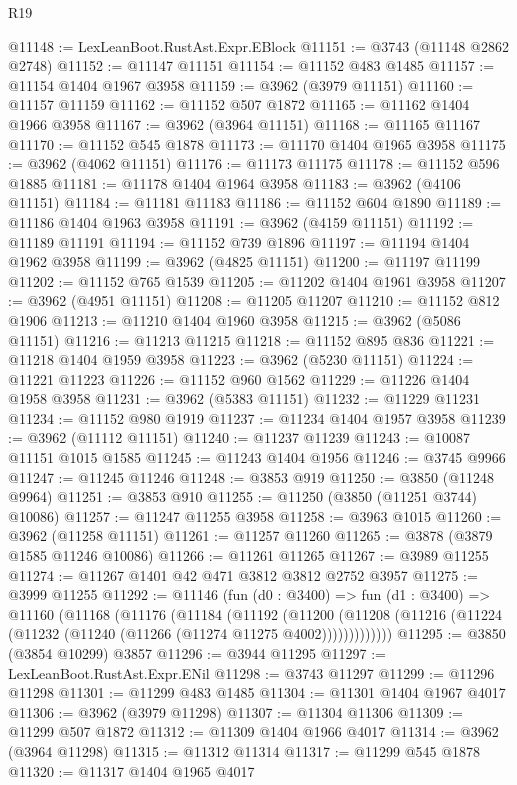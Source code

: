 \begin{lexlean}{R19}
\begin{coremodule}
@11148 := LexLeanBoot.RustAst.Expr.EBlock
@11151 := @3743 (@11148 @2862 @2748)
@11152 := @11147 @11151
@11154 := @11152 @483 @1485
@11157 := @11154 @1404 @1967 @3958
@11159 := @3962 (@3979 @11151)
@11160 := @11157 @11159
@11162 := @11152 @507 @1872
@11165 := @11162 @1404 @1966 @3958
@11167 := @3962 (@3964 @11151)
@11168 := @11165 @11167
@11170 := @11152 @545 @1878
@11173 := @11170 @1404 @1965 @3958
@11175 := @3962 (@4062 @11151)
@11176 := @11173 @11175
@11178 := @11152 @596 @1885
@11181 := @11178 @1404 @1964 @3958
@11183 := @3962 (@4106 @11151)
@11184 := @11181 @11183
@11186 := @11152 @604 @1890
@11189 := @11186 @1404 @1963 @3958
@11191 := @3962 (@4159 @11151)
@11192 := @11189 @11191
@11194 := @11152 @739 @1896
@11197 := @11194 @1404 @1962 @3958
@11199 := @3962 (@4825 @11151)
@11200 := @11197 @11199
@11202 := @11152 @765 @1539
@11205 := @11202 @1404 @1961 @3958
@11207 := @3962 (@4951 @11151)
@11208 := @11205 @11207
@11210 := @11152 @812 @1906
@11213 := @11210 @1404 @1960 @3958
@11215 := @3962 (@5086 @11151)
@11216 := @11213 @11215
@11218 := @11152 @895 @836
@11221 := @11218 @1404 @1959 @3958
@11223 := @3962 (@5230 @11151)
@11224 := @11221 @11223
@11226 := @11152 @960 @1562
@11229 := @11226 @1404 @1958 @3958
@11231 := @3962 (@5383 @11151)
@11232 := @11229 @11231
@11234 := @11152 @980 @1919
@11237 := @11234 @1404 @1957 @3958
@11239 := @3962 (@11112 @11151)
@11240 := @11237 @11239
@11243 := @10087 @11151 @1015 @1585
@11245 := @11243 @1404 @1956
@11246 := @3745 @9966
@11247 := @11245 @11246
@11248 := @3853 @919
@11250 := @3850 (@11248 @9964)
@11251 := @3853 @910
@11255 := @11250 (@3850 (@11251 @3744) @10086)
@11257 := @11247 @11255 @3958
@11258 := @3963 @1015
@11260 := @3962 (@11258 @11151)
@11261 := @11257 @11260
@11265 := @3878 (@3879 @1585 @11246 @10086)
@11266 := @11261 @11265
@11267 := @3989 @11255
@11274 := @11267 @1401 @42 @471 @3812 @3812 @2752 @3957
@11275 := @3999 @11255
@11292 := @11146
    (fun (d0 : @3400) =>
    fun (d1 : @3400) =>
    @11160
      (@11168
        (@11176
          (@11184
            (@11192
              (@11200
                (@11208 (@11216 (@11224 (@11232 (@11240 (@11266 (@11274 @11275 @4002)))))))))))))
@11295 := @3850 (@3854 @10299) @3857
@11296 := @3944 @11295
@11297 := LexLeanBoot.RustAst.Expr.ENil
@11298 := @3743 @11297
@11299 := @11296 @11298
@11301 := @11299 @483 @1485
@11304 := @11301 @1404 @1967 @4017
@11306 := @3962 (@3979 @11298)
@11307 := @11304 @11306
@11309 := @11299 @507 @1872
@11312 := @11309 @1404 @1966 @4017
@11314 := @3962 (@3964 @11298)
@11315 := @11312 @11314
@11317 := @11299 @545 @1878
@11320 := @11317 @1404 @1965 @4017

\end{coremodule}
\end{lexlean}
